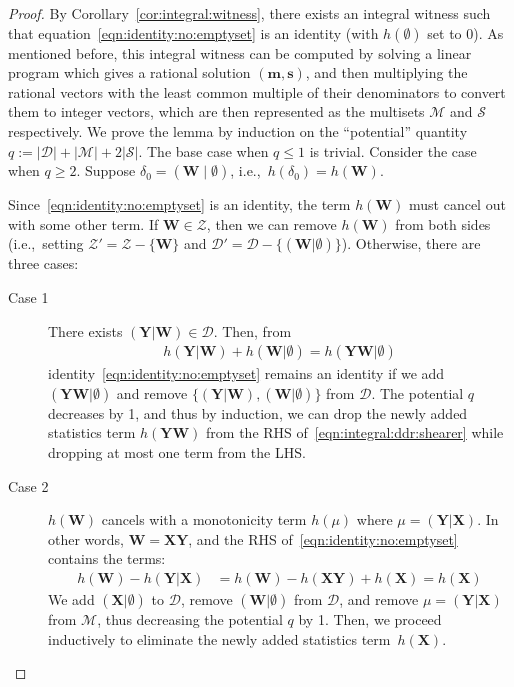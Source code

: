 \documentclass{theoretics}
\newcommand{\calM}{\mathcal M}
\newcommand{\calS}{\mathcal S}
\newcommand{\calD}{\mathcal D}
\newcommand{\calZ}{\mathcal Z}
\begin{document}
\begin{proof} By Corollary~\ref{cor:integral:witness}, there exists an integral witness such
that equation~\eqref{eqn:identity:no:emptyset} is an identity (with $h(\emptyset)$ set to $0$).
As mentioned before, this integral witness can be computed by solving a linear program
which gives a rational solution $(\bm m, \bm s)$, and then multiplying the rational vectors with the least common multiple of their denominators to convert them to integer vectors, which are then represented as the multisets $\calM$ and $\calS$ respectively.
We prove the lemma by induction on the ``potential'' quantity $q:=|\calD|+|\calM|+2|\calS|$.
The base case when $q \leq 1$ is trivial.
Consider the case when $q \geq 2$.
Suppose $\delta_0 = (\bm W \mid \emptyset)$, i.e.,~$h(\delta_0) = h(\bm W)$.

Since~\eqref{eqn:identity:no:emptyset} is an identity, the term $h(\bm W)$ must cancel out
with some other term. If $\bm W \in\calZ$, then we can remove $h(\bm W)$ from both sides
(i.e.,~setting $\calZ' = \calZ - \{\bm W\}$ and
$\calD' = \calD - \{(\bm W|\emptyset)\}$). Otherwise, there are three cases:

\begin{description}
  \item[Case 1]  There exists $(\bm Y|\bm W) \in \calD$.
    Then, from
    \begin{align}
      h(\bm Y|\bm W) + h(\bm W|\emptyset) = h(\bm Y\bm W|\emptyset)
      \label{eqn:D:step}
    \end{align}
    identity~\eqref{eqn:identity:no:emptyset} remains an identity if we
    add $(\bm Y\bm W|\emptyset)$ and remove
    $\{(\bm Y|\bm W), (\bm W|\emptyset)\}$ from $\calD$.
    The potential $q$ decreases by 1, and thus by induction,
    we can drop the newly added statistics term $h(\bm Y\bm W)$ from the RHS of~\eqref{eqn:integral:ddr:shearer} while dropping at most one term from the LHS.

  \item[Case 2] $h(\bm W)$ cancels with a monotonicity term $h(\mu)$ where
    $\mu = (\bm Y|\bm X)$.  In other words, $\bm W = \bm X\bm Y$, and
    the RHS of~\eqref{eqn:identity:no:emptyset} contains the terms:
    \begin{align}
        h(\bm W) - h(\bm Y|\bm X) &= h(\bm W) - h(\bm X\bm Y)+h(\bm X) =  h(\bm X)
        \label{eqn:M:step}
    \end{align}
    We add $(\bm X|\emptyset)$ to $\calD$, remove $(\bm W|\emptyset)$ from $\calD$, and remove
    $\mu = (\bm Y|\bm X)$ from $\calM$, thus decreasing the potential $q$ by 1.  Then, we proceed
    inductively to eliminate the newly added statistics term~$h(\bm X)$.


\end{description}
\end{proof}
\end{document}
